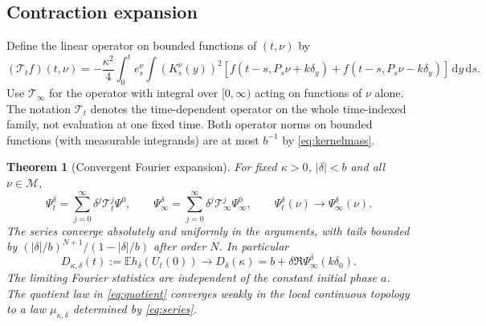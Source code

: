 \documentclass[11pt]{article}
\numberwithin{equation}{section}
\newtheorem{theorem}{Theorem}[section]
\theoremstyle{definition}
\theoremstyle{remark}
\newcommand{\E}{\mathbb E}
\newcommand{\dd}{\,\mathrm d}
\begin{document}
\subsection{Contraction expansion}
Define the linear operator on bounded functions of $(t,\nu)$ by
\[
 (\mathcal T_t f)(t,\nu)=-\frac{\kappa^2}{4}\int_0^t e_s^\nu\int(K_s^\nu(y))^2
 [f(t-s,P_s\nu+k\delta_y)+f(t-s,P_s\nu-k\delta_y)]\dd y\dd s.
\]
Use $\mathcal T_\infty$ for the operator with integral over $[0,\infty)$ acting on functions of $\nu$ alone. The notation $\mathcal T_t$ denotes the time-dependent operator on the whole time-indexed family, not evaluation at one fixed time. Both operator norms on bounded functions (with measurable integrands) are at most $b^{-1}$ by \eqref{eq:kernelmass}.
\begin{theorem}[Convergent Fourier expansion]\label{thm:contraction}
For fixed $\kappa>0$, $|\delta|<b$ and all $\nu\in\mathcal M$,
\begin{equation}\label{eq:series}
 \Psi_t^\delta=\sum_{j=0}^\infty \delta^j\mathcal T_t^j\Psi^0,
 \qquad
 \Psi_\infty^\delta=\sum_{j=0}^\infty\delta^j\mathcal T_\infty^j\Psi_\infty^0,
 \qquad \Psi_t^\delta(\nu)\longrightarrow\Psi_\infty^\delta(\nu).
\end{equation}
The series converge absolutely and uniformly in the arguments, with tails bounded by $(|\delta|/b)^{N+1}/(1-|\delta|/b)$ after order $N$. In particular
\begin{equation}\label{eq:D_exists}
 D_{\kappa,\delta}(t):=\E h_\delta(U_t(0))\longrightarrow
 D_\delta(\kappa)=b+\delta\Re\Psi_\infty^\delta(k\delta_0).
\end{equation}
The limiting Fourier statistics are independent of the constant initial phase $a$. The quotient law in \eqref{eq:quotient} converges weakly in the local continuous topology to a law $\mu_{\kappa,\delta}$ determined by \eqref{eq:series}.
\end{theorem}
\end{document}
